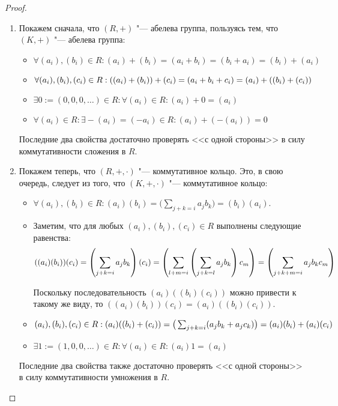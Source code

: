 \begin{proof}~
	\begin{enumerate}
		\item Покажем сначала, что $(R, +)$ "--- абелева группа, пользуясь тем, что $(K, +)$ "--- абелева группа:
		\begin{itemize}
			\item $\forall (a_i), (b_i) \in R: (a_i) + (b_i) = (a_i + b_i) = (b_i + a_i) = (b_i) + (a_i)$
			\item $\forall (a_i), (b_i), (c_i) \in R:  ((a_i) + (b_i)) + (c_i) = (a_i + b_i + c_i) \hm{=} (a_i) + ((b_i) + (c_i))$
			\item $\exists 0 := (0, 0, 0, \dots) \in R: \forall (a_i) \in R: (a_i) + 0 = (a_i)$
			\item $\forall (a_i) \in R: \exists\! -(a_i) = (-a_i) \in R: (a_i) + (-(a_i)) = 0$
		\end{itemize}
	
		Последние два свойства достаточно проверять <<с одной стороны>> в силу коммутативности сложения в $R$.
		
		\item Покажем теперь, что $(R, +, \cdot)$ "--- коммутативное кольцо. Это, в свою очередь, следует из того, что $(K, +, \cdot)$ "--- коммутативное кольцо:
		\begin{itemize}
			\item $\forall (a_i), (b_i) \in R: (a_i)(b_i) = \big(\sum_{j + k = i}a_jb_k\big) = (b_i)(a_i)$.
			
			\item Заметим, что для любых $(a_i), (b_i), (c_i) \in R$ выполнены следующие равенства:
			\[((a_i)(b_i))(c_i) = \left(\sum_{j + k = i}a_jb_k\right)(c_i) = \left(\sum_{l + m = i}\left(\sum_{j + k = l}a_jb_k\right)c_m\right) \hm{=} \left(\sum_{j+k+m = i}a_jb_kc_m\right)\]
			
			Поскольку последовательность $(a_i)((b_i)(c_i))$ можно привести к такому же виду, то $((a_i)(b_i))(c_i) = (a_i)((b_i)(c_i))$.
			\item $(a_i), (b_i), (c_i) \in R: (a_i)((b_i) + (c_i)) = \big(\sum_{j + k = i}(a_jb_k + a_jc_k)\big) \hm{=} (a_i)(b_i) + (a_i)(c_i)$
			\item $\exists 1 := (1, 0, 0, \dots) \in R: \forall (a_i) \in R: (a_i)1 = (a_i)$
		\end{itemize}
	
		Последние два свойства также достаточно проверять <<с одной стороны>> в силу коммутативности умножения в $R$.\qedhere
	\end{enumerate}
\end{proof}

